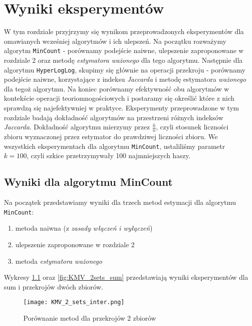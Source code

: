 \chapter{Wyniki eksperymentów}
\thispagestyle{chapterBeginStyle}

W tym rozdziale przyjrzymy się wynikom przeprowadzonych eksperymentów dla omawianych wcześniej algorytmów i ich ulepszeń. Na początku rozważymy algorytm \texttt{MinCount} - porównamy podejście naiwne, ulepszenie zaproponowane w rozdziale 2 oraz metodę \textit{estymatora ważonego} dla tego algorytmu. Następnie dla algorytmu \texttt{HyperLogLog}, skupimy się głównie na operacji przekroju - porównamy podejście naiwne, korzystające z indeksu \textit{Jaccarda} i metodę estymatora \textit{ważonego} dla tegoż algorytmu. Na koniec porównamy efektywność obu algorytmów w kontekście operacji teoriomnogościowych i postaramy się określić które z nich sprawdzą się najefektywniej w praktyce. Eksperymenty przeprowadzone w tym rozdziale badają dokładność algorytmów na przestrzeni różnych indeksów \textit{Jaccarda}. Dokładność algorytmu mierzymy przez $\frac{\hat{n}}{n}$, czyli stosunek liczności zbioru wyznaczonej przez estymator do prawdziwej liczności zbioru. We wszystkich eksperymentach dla algorytmu \texttt{MinCount}, ustaliliśmy parametr $k = 100$, czyli szkice przetrzymywały 100 najmniejszych haszy.

\section{Wyniki dla algorytmu MinCount}
Na początek przedstawiamy wyniki dla trzech metod estymacji dla algorytmu \texttt{MinCount}:
\begin{enumerate}
	\item metoda naiwna (z \textit{zasady włączeń i wyłączeń})
	\item ulepszenie zaproponowane w rozdziale 2
	\item metoda \textit{estymatora ważonego}
\end{enumerate}

Wykresy \ref{fig:KMV_2sets_inter} oraz \ref{fig:KMV_2sets_sum} przedstawiają wyniki eksperymentów dla sum i przekrojów dwóch zbiorów.

\begin{figure}[h!]
    \texttt{[image: KMV\_2\_sets\_inter.png]}
    \centering
    \caption{Porównanie metod dla przekrojów 2 zbiorów}
    \label{fig:KMV_2sets_inter}
\end{figure}

